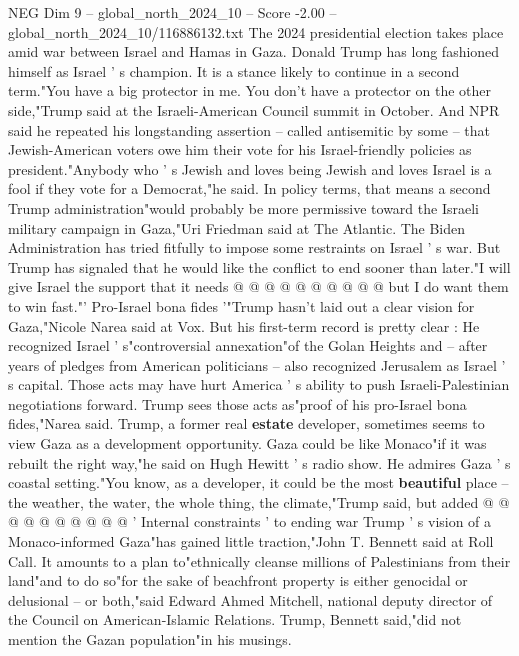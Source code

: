 \begin{textsample}{NEG Dim 9 – global\_north\_2024\_10 – Score -2.00 – global\_north\_2024\_10/116886132.txt}  \label{ex:f9_neg_232}
The 2024 presidential election takes place amid war between Israel and Hamas in Gaza.
Donald Trump has long fashioned himself as Israel ' s champion.
It is a stance likely to continue in a second term."You have a big protector in me.
You don't have a protector on the other side,"Trump said at the Israeli-American Council summit in October.
And NPR said he repeated his longstanding assertion -- called antisemitic by some -- that Jewish-American voters owe him their vote for his Israel-friendly policies as president."Anybody who ' s Jewish and loves being Jewish and loves Israel is a fool if they vote for a Democrat,"he said.
In policy terms, that means a second Trump administration"would probably be more permissive toward the Israeli military campaign in Gaza,"Uri Friedman said at The Atlantic.
The Biden Administration has tried fitfully to impose some restraints on Israel ' s war.
But Trump has signaled that he would like the conflict to end sooner than later."I will give Israel the support that it needs @ @ @ @ @ @ @ @ @ @ but I do want them to win fast."' Pro-Israel bona fides '"Trump hasn't laid out a clear vision for Gaza,"Nicole Narea said at Vox.
But his first-term record is pretty clear : He recognized Israel ' s"controversial annexation"of the Golan Heights and -- after years of pledges from American politicians -- also recognized Jerusalem as Israel ' s capital.
Those acts may have hurt America ' s ability to push Israeli-Palestinian negotiations forward.
Trump sees those acts as"proof of his pro-Israel bona fides,"Narea said.
Trump, a former real \textbf{estate} developer, sometimes seems to view Gaza as a development opportunity.
Gaza could be like Monaco"if it was rebuilt the right way,"he said on Hugh Hewitt ' s radio show.
He admires Gaza ' s coastal setting."You know, as a developer, it could be the most \textbf{beautiful} place -- the weather, the water, the whole thing, the climate,"Trump said, but added @ @ @ @ @ @ @ @ @ @ ' Internal constraints ' to ending war Trump ' s vision of a Monaco-informed Gaza"has gained little traction,"John T.
Bennett said at Roll Call.
It amounts to a plan to"ethnically cleanse millions of Palestinians from their land"and to do so"for the sake of beachfront property is either genocidal or delusional -- or both,"said Edward Ahmed Mitchell, national deputy director of the Council on American-Islamic Relations.
Trump, Bennett said,"did not mention the Gazan population"in his musings.

\end{textsample}
